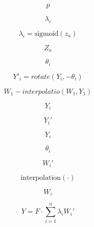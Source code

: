 \documentclass[journal]{IEEEtran}
\begin{document}
\begin{equation}
p
\label{eq:eq_22}
\end{equation}

\begin{equation}
\lambda_i
\label{eq:eq_23}
\end{equation}

\begin{equation}
\lambda_i = \text{sigmoid}(z_a)
\label{eq:eq_24}
\end{equation}

\begin{equation}
Z_a
\label{eq:eq_25}
\end{equation}

\begin{equation}
\theta_i
\label{eq:eq_26}
\end{equation}

\begin{equation}
Y'_i = rotate(Y_i, -\theta_i)
\label{eq:eq_27}
\end{equation}

\begin{equation}
W_1-interpolatio(W_1, Y_1)
\label{eq:eq_28}
\end{equation}

\begin{equation}
Y_i
\label{eq:eq_29}
\end{equation}

\begin{equation}
Y_i'
\label{eq:eq_30}
\end{equation}

\begin{equation}
Y_i
\label{eq:eq_31}
\end{equation}

\begin{equation}
\theta_i
\label{eq:eq_32}
\end{equation}

\begin{equation}
W_i'
\label{eq:eq_33}
\end{equation}

\begin{equation}
\text{interpolation}(\cdot)
\label{eq:eq_34}
\end{equation}

\begin{equation}
W_i
\label{eq:eq_35}
\end{equation}

\begin{equation}
Y = F \cdot \sum_{i=1}^n \lambda_i W_i'
\label{eq:eq_36}
\end{equation}
\end{document}
